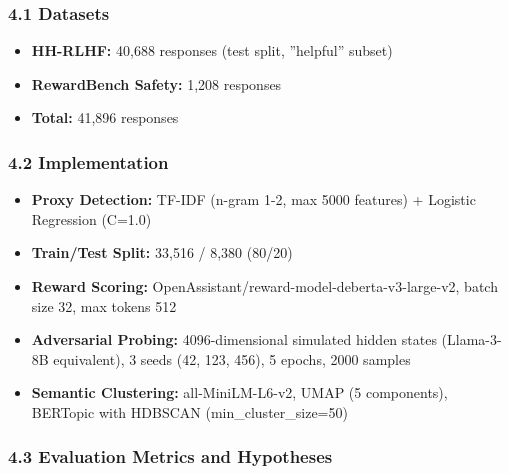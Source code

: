 
\subsubsection{4.1 Datasets}

\begin{itemize}
\item \textbf{HH-RLHF:} 40,688 responses (test split, ''helpful'' subset)
\item \textbf{RewardBench Safety:} 1,208 responses
\item \textbf{Total:} 41,896 responses
\end{itemize}

\subsubsection{4.2 Implementation}

\begin{itemize}
\item \textbf{Proxy Detection:} TF-IDF (n-gram 1-2, max 5000 features) + Logistic Regression (C=1.0)
\item \textbf{Train/Test Split:} 33,516 / 8,380 (80/20)
\item \textbf{Reward Scoring:} OpenAssistant/reward-model-deberta-v3-large-v2, batch size 32, max tokens 512
\item \textbf{Adversarial Probing:} 4096-dimensional simulated hidden states (Llama-3-8B equivalent), 3 seeds (42, 123, 456), 5 epochs, 2000 samples
\item \textbf{Semantic Clustering:} all-MiniLM-L6-v2, UMAP (5 components), BERTopic with HDBSCAN (min\_cluster\_size=50)
\end{itemize}

\subsubsection{4.3 Evaluation Metrics and Hypotheses}

\begin{table}[htbp]
\centering
{}
\end{table}
